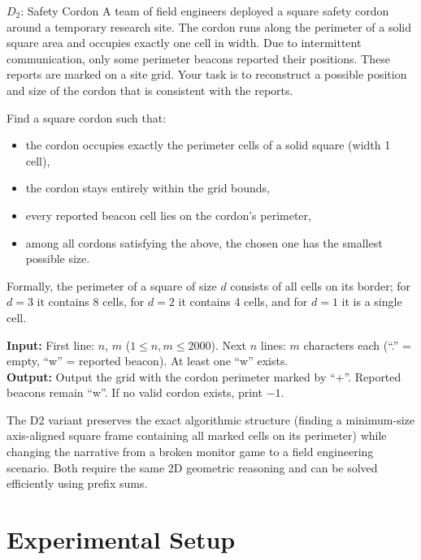\documentclass[]{bytedance_seed}
\theoremstyle{plain}
\theoremstyle{definition}
\theoremstyle{remark}
\begin{document}
\begin{problembox}{$D_2$: Safety Cordon}
A team of field engineers deployed a square safety cordon around a temporary research site. The cordon runs along the perimeter of a solid square area and occupies exactly one cell in width. Due to intermittent communication, only some perimeter beacons reported their positions. These reports are marked on a site grid. Your task is to reconstruct a possible position and size of the cordon that is consistent with the reports.

Find a square cordon such that:
\begin{itemize}[nosep]
\item the cordon occupies exactly the perimeter cells of a solid square (width 1 cell),
\item the cordon stays entirely within the grid bounds,
\item every reported beacon cell lies on the cordon's perimeter,
\item among all cordons satisfying the above, the chosen one has the smallest possible size.
\end{itemize}

Formally, the perimeter of a square of size $d$ consists of all cells on its border; for $d = 3$ it contains 8 cells, for $d = 2$ it contains 4 cells, and for $d = 1$ it is a single cell.

\vspace{1.5mm}
\noindent\textbf{Input:} First line: $n$, $m$ ($1 \le n, m \le 2000$). Next $n$ lines: $m$ characters each (``.'' = empty, ``w'' = reported beacon). At least one ``w'' exists.\\
\textbf{Output:} Output the grid with the cordon perimeter marked by ``+''. Reported beacons remain ``w''. If no valid cordon exists, print $-1$.
\end{problembox}

\noindent The D2 variant preserves the exact algorithmic structure (finding a minimum-size axis-aligned square frame containing all marked cells on its perimeter) while changing the narrative from a broken monitor game to a field engineering scenario. Both require the same 2D geometric reasoning and can be solved efficiently using prefix sums.
\fi


\section{Experimental Setup}
\label{app:experimental-setup}
\end{document}
